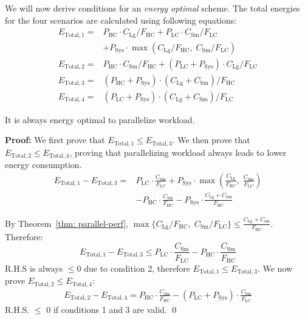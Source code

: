 We will now derive conditions for an \textit{energy optimal} scheme. The total energies for the four scenarios are calculated using following equations:  
\begin{align*}
E_{\mathrm{Total},1} =& P_{\mathrm{HC}}\cdot C_\mathrm{Lg}/F_\mathrm{HC} + P_{\mathrm{LC}}  \cdot C_\mathrm{Sm}/F_\mathrm{LC}\\
&+P_{\mathrm{Sys}}\cdot \max(C_\mathrm{Lg}/F_\mathrm{HC},\;C_\mathrm{Sm}/F_\mathrm{LC})\\ 
E_{\mathrm{Total},2} =& P_{\mathrm{HC}}\cdot C_\mathrm{Sm}/F_\mathrm{HC} + (P_{\mathrm{LC}}+ P_{\mathrm{Sys}})  \cdot C_\mathrm{Lg}/F_\mathrm{LC}\\
E_{\mathrm{Total},3} =& (P_{\mathrm{HC}} + P_{\mathrm{Sys}})\cdot (C_\mathrm{Lg}+ C_\mathrm{Sm})/F_\mathrm{HC}\\
E_{\mathrm{Total},4} =& (P_{\mathrm{LC}} + P_{\mathrm{Sys}})\cdot (C_\mathrm{Lg}+ C_\mathrm{Sm})/F_\mathrm{LC}
\end{align*}
\begin{theorem}\label{thm:parallel}
It is always energy optimal to parallelize workload.
\end{theorem}
\noindent\textbf{Proof:} We first prove that $E_\mathrm{Total, 1}\leq E_\mathrm{Total, 3}$. We then prove that $E_\mathrm{Total, 2}\leq E_\mathrm{Total, 4}$, proving that parallelizing workload always leads to lower energy consumption.  
\begin{align*} 
 E_{\mathrm{Total},1}-E_{\mathrm{Total},3}=& P_{\mathrm{LC}} \cdot \frac{C_\mathrm{Sm}}{F_\mathrm{LC}} + P_{\mathrm{Sys}}\cdot \max(\frac{C_\mathrm{Lg}}{F_\mathrm{HC}},\;\frac{C_\mathrm{Sm}}{F_\mathrm{LC}}) 
\\&- P_{\mathrm{HC}} \cdot \frac{C_\mathrm{Sm}}{F_\mathrm{HC}}-P_{\mathrm{Sys}}\cdot \frac{C_\mathrm{Lg}+C_\mathrm{Sm}}{F_\mathrm{HC}}
\end{align*}

By Theorem~\ref{thm: parallel-perf}, $\max\{C_\mathrm{Lg}/F_{\mathrm{HC}}, \;C_\mathrm{Sm}/F_{\mathrm{LC}} \}\leq \frac{C_\mathrm{Lg}+C_\mathrm{sm}}{F_\mathrm{HC}}$. Therefore:
\[ 
 E_{\mathrm{Total},1}-E_{\mathrm{Total},3}\leq P_{\mathrm{LC}} \cdot \frac{C_\mathrm{Sm}}{F_\mathrm{LC}}- P_{\mathrm{HC}} \cdot\frac{C_\mathrm{Sm}}{F_\mathrm{HC}}
\]
R.H.S is always $\leq 0$ due to condition 2, therefore $E_\mathrm{Total, 1}\leq E_\mathrm{Total, 3}$. We now prove $E_\mathrm{Total,2}\leq E_\mathrm{Total,4}$:
\begin{equation*}
\begin{split}
E_\mathrm{Total,2}-E_\mathrm{Total,4}=P_{\mathrm{HC}}\cdot \frac{C_\mathrm{Sm}}{F_\mathrm{HC}} - (P_{\mathrm{LC}}+P_{\mathrm{Sys}})  \cdot \frac{C_\mathrm{Sm}}{F_\mathrm{LC}} 
\end{split}
\end{equation*}
R.H.S. $\leq$ 0 if conditions 1 and 3 are valid. \qed

